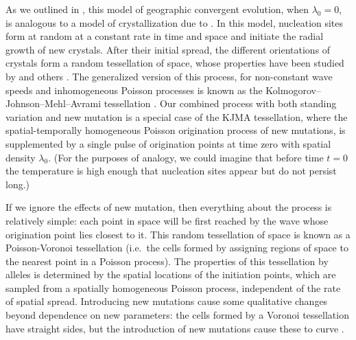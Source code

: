 \documentclass{article}
\begin{document}
As we outlined in \citet{ralphcoop2010}, this model of
geographic convergent evolution, when $\lambda_0=0$, is analogous to a model of crystallization due to \citet{kolmogorov-crystallization}.
In this model, nucleation sites form at random at a constant rate in time and space 
and initiate the radial growth of new crystals. 
After their initial spread, the different orientations of crystals form a random tessellation of space,
whose properties have been studied by \citet{moller92,moller95} and others \citep{bollobas-crystallization,gilbert-crystallization}. 
The generalized version of this process, for non-constant wave speeds
and inhomogeneous Poisson processes is known as the 
Kolmogorov--Johnson--Mehl--Avrami tessellation \citep{fanfoni-tomellini}.
Our combined process with both standing variation and new mutation is
a special case of the KJMA tessellation, 
where the spatial-temporally homogeneous Poisson origination process of new mutations, 
is supplemented by a single pulse of origination points at time zero with spatial density $\lambda_0$.
(For the purposes of analogy, we could imagine that before time $t=0$
the temperature is high enough that nucleation sites appear but do not persist long.)

If we ignore the effects of new mutation,
then everything about the process is relatively simple:
each point in space will be first reached by the wave whose origination point lies closest to it.
This random tessellation of space is known as a Poisson-Voronoi tessellation \citep{Moller:94}
(i.e.\ the cells formed by assigning regions of space to the nearest point in a Poisson process).
The properties of this tessellation by alleles is
determined by the spatial locations of the initiation points, 
which are sampled from a spatially homogeneous Poisson process, 
independent of the rate of spatial spread. 
Introducing new mutations cause some qualitative changes
beyond dependence on new parameters:
the cells formed by a Voronoi tessellation have straight sides,
but the introduction of new mutations cause these to curve
\citep[because the radii of the colliding circles differ; see Figure 1 of ][ for a graphical depiction of this point]{ralphcoop2010}.
\end{document}
